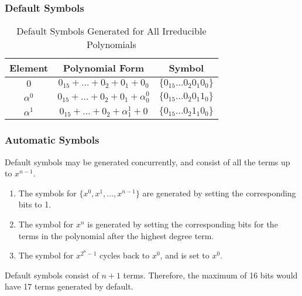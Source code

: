 \documentclass[paper=usletter, fontsize=12pt]{article}
\begin{document}
            \subsubsection{Default Symbols}
           \begin{table}[h]
                \def\arraystretch{2.5}
                \caption{Default Symbols Generated for All Irreducible Polynomials}
                \centering
                \begin{tabular*}{300pt}{@{\extracolsep{\fill}} ccc}

                \textbf{Element} & \textbf{Polynomial Form} & \textbf{Symbol} \\
                \hline
                $0$ & $0_{15} + \ldots + 0_{2} + 0_{1} + 0_{0}$ & $\{0_{15}\ldots0_{2}0_{1}0_{0}\}$ \\
                $\alpha^{0}$ & $0_{15} + \ldots + 0_{2} + 0_{1} + \alpha^{0}_{0}$ & $\{0_{15}\ldots0_{2}0_{1}1_{0}\}$ \\
                $\alpha^{1}$ & $0_{15} + \ldots + 0_{2} + \alpha^{1}_{1} + 0$ & $\{0_{15}\ldots0_{2}1_{1}0_{0}\}$ \\
                \end{tabular*}
            \end{table}

            \subsubsection{Automatic Symbols}

            Default symbols may be generated concurrently, and consist of all the terms up to $x^{n-1}$.

            \begin{enumerate}
                \item The symbols for $\{x^{0}, x^{1}, \ldots, x^{n-1}\}$ are generated by setting the corresponding bits to 1.
                \item The symbol for $x^{n}$ is generated by setting the corresponding bits for the terms in the polynomial after the highest degree term.
                \item The symbol for $x^{2^{n}-1}$ cycles back to $x^{0}$, and is set to $x^{0}$.
            \end{enumerate}

            Default symbols consist of $n+1$ terms. Therefore, the maximum of 16 bits would have 17 terms generated by default.
\end{document}
